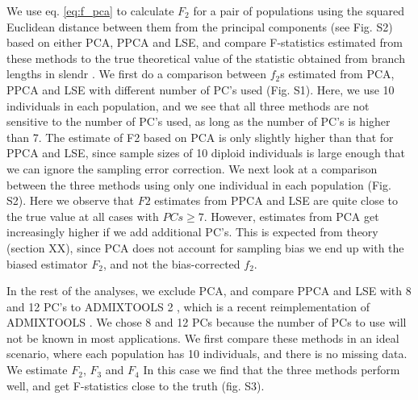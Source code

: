 \documentclass[12pt, letterpaper]{article}
\begin{document}
We use eq. \ref{eq:f_pca} to calculate $F_2$ for a pair of populations using the  squared Euclidean distance between them from the principal components (see Fig. S2) based on either  PCA, PPCA and LSE, and compare F-statistics estimated from these methods to the true theoretical value of the statistic obtained from branch lengths in slendr \cite{petr_slendr_2022}. We first do a comparison between $f_2$s estimated from PCA, PPCA and LSE with different number of PC's used (Fig. S1). Here, we use 10 individuals in each population, and we see that all three methods are not sensitive to the number of PC's used, as long as the number of PC's is higher than 7. The estimate of F2 based on PCA is only slightly higher than that for PPCA and LSE, since sample  sizes of 10 diploid individuals is large enough that we can ignore the sampling error correction. We next look at a comparison between the three methods using only one individual in each population (Fig. S2). Here we observe that $F2$ estimates from PPCA and LSE are quite close to the true value at all cases with $PCs \geq 7$. However, estimates from PCA get increasingly higher if we add additional PC's. This is expected from theory (section XX), since PCA does not account for sampling bias we end up with the biased estimator $F_2$, and not the bias-corrected $f_2$.

In the rest of the analyses, we exclude PCA, and compare PPCA and LSE with 8 and 12 PC's to ADMIXTOOLS 2 \cite{maier_limits_2022}, which is a recent reimplementation of ADMIXTOOLS \cite{patterson_ancient_2012}. We chose 8 and 12 PCs because the number of PCs to use will not be known in most applications. We first compare these methods in an ideal scenario, where each population has 10 individuals, and there is no missing data. We estimate $F_2$, $F_3$ and $F_4$  In this case we find that the three methods perform well, and get F-statistics close to the truth (fig. S3). 
\end{document}
